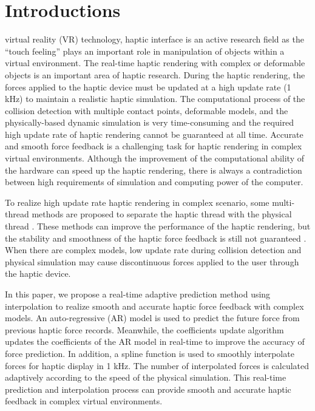 \documentclass[10pt,journal,cspaper,compsoc]{IEEEtran}
\begin{document}
\maketitle


\IEEEdisplaynotcompsoctitleabstractindextext



\IEEEpeerreviewmaketitle



\section{Introductions}




 virtual reality (VR) technology, haptic interface is an active research field as the ``touch feeling'' plays an important role in manipulation of objects within a virtual environment. The real-time haptic rendering with complex or deformable objects is an important area of haptic research. During the haptic rendering, the forces applied to the haptic device must be updated at a high update rate (1 kHz) to maintain a realistic haptic simulation. The computational process of the collision detection with multiple contact points, deformable models, and the physically-based dynamic simulation is very time-consuming and the required high update rate of haptic rendering cannot be guaranteed at all time. Accurate and smooth force feedback is a challenging task for haptic rendering in complex virtual environments. Although the improvement of the computational ability of the hardware can speed up the haptic rendering, there is always a contradiction between high requirements of simulation and computing power of the computer. 

To realize high update rate haptic rendering in complex scenario, some multi-thread methods are proposed to separate the haptic thread with the physical thread \cite{no01,no02,no03}. These methods can improve the performance of the haptic rendering, but the stability and smoothness of the haptic force feedback is still not guaranteed \cite{no01}. When there are complex models, low update rate during collision detection and physical simulation may cause discontinuous forces applied to the user through the haptic device.

In this paper, we propose a real-time adaptive prediction method using interpolation to realize smooth and accurate haptic force feedback with complex models. An auto-regressive (AR) model is used to predict the future force from previous haptic force records. Meanwhile, the coefficients update algorithm updates the coefficients of the AR model in real-time to improve the accuracy of force prediction. In addition, a spline function is used to smoothly interpolate forces for haptic display in 1 kHz. The number of interpolated forces is calculated adaptively according to the speed of the physical simulation. This real-time prediction and interpolation process can provide smooth and accurate haptic feedback in complex virtual environments. 
\end{document}
